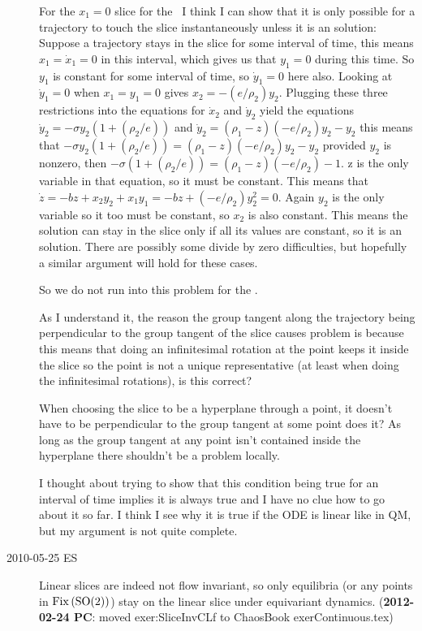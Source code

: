 \begin{description}
    For the $x_1 = 0$ slice for the \cLe\ I think I can show that it is only possible for a trajectory to touch the slice instantaneously unless it is an {\eqv} solution: Suppose a trajectory stays in the slice for some interval of time, this means $x_1 = \dot x_1 = 0$ in this interval, which gives us that $y_1 = 0$ during this time. So $y_1$ is constant for some interval of time, so $\dot y_1=0$ here also. Looking at $\dot y_1 = 0$ when $x_1=y_1 =0$ gives $x_2 = -(e/\rho_2)y_2$. Plugging these three restrictions into the equations for $\dot x_2$ and $\dot y_2$ yield the equations $\dot y_2=-\sigma y_2 (1+(\rho_2 / e))$ and $\dot y_2 = (\rho_1 - z)(-e/\rho_2)y_2-y_2$ this means that $-\sigma y_2 (1+(\rho_2 / e))=(\rho_1 - z)(-e/\rho_2)y_2-y_2$ provided $y_2$ is nonzero, then $-\sigma (1+(\rho_2 / e))=(\rho_1-z)(-e/\rho_2)-1$. z is the only variable in that equation, so it must be constant. This means that $\dot z = -b z + x_2 y_2 + x_1 y_1=-b z+ (-e/\rho_2)y_2^2=0$. Again $y_2$ is the only variable so it too must be constant, so $x_2$ is also constant. This means the solution can stay in the slice only if all its values are constant, so it is an {\eqv} solution. There are possibly some divide by zero difficulties, but hopefully a similar argument will hold for these cases.

    So we do not run into this problem for the \cLf.

    As I understand it, the reason the group tangent along the trajectory being perpendicular to the group tangent of the slice causes problem is because this means that doing an infinitesimal rotation at the point keeps it inside the slice so the point is not a unique representative (at least when doing the infinitesimal rotations), is this correct?

    When choosing the slice to be a hyperplane through a point, it doesn't have to be perpendicular to the group tangent at some point does it? As long as the group tangent at any point isn't contained inside the hyperplane there shouldn't be a problem locally.

    I thought about trying to show that this condition being true for an interval of time implies it is always true and I have no clue how to go about it so far. I think I see why it is true if the ODE is linear like in QM, but my argument is not quite complete.


\item[2010-05-25 ES]
Linear slices are indeed not flow invariant, so only equilibria (or any
points in $\mathrm{Fix}\left(\textrm{SO}(2)\right)$) stay on the linear slice under equivariant
dynamics.
({\bf 2012-02-24 PC}: moved exer:SliceInvCLf to ChaosBook
exerContinuous.tex)


\end{description}
